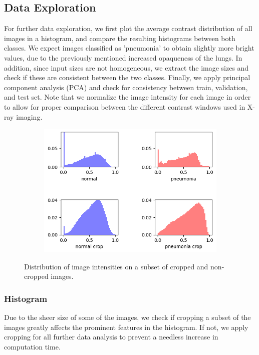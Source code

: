 \subsection{Data Exploration}
For further data exploration, we first plot the average contrast distribution of all images in a histogram, and compare the resulting histograms between both classes. We expect images classified as 'pneumonia' to obtain slightly more bright values, due to the previously mentioned increased opaqueness of the lungs.
In addition, since input sizes are not homogeneous, we extract the image sizes and check if these are consistent between the two classes.
Finally, we apply principal component analysis (PCA) and check for consistency between train, validation, and test set.
Note that we normalize the image intensity for each image in order to allow for proper comparison between the different contrast windows used in X-ray imaging.

\begin{figure}[H]
    \centering
    \begin{subfigure}{\columnwidth}
        \includegraphics[width=1\textwidth]{images/histo_crop.png}
    \end{subfigure}
    \caption{Distribution of image intensities on a subset of cropped and non-cropped images.}
    \label{fig:histo_crop}
\end{figure}

\subsubsection{Histogram}
Due to the sheer size of some of the images, we check if cropping a subset of the images greatly affects the prominent features in the histogram. If not, we apply cropping for all further data analysis to prevent a needless increase in computation time.

